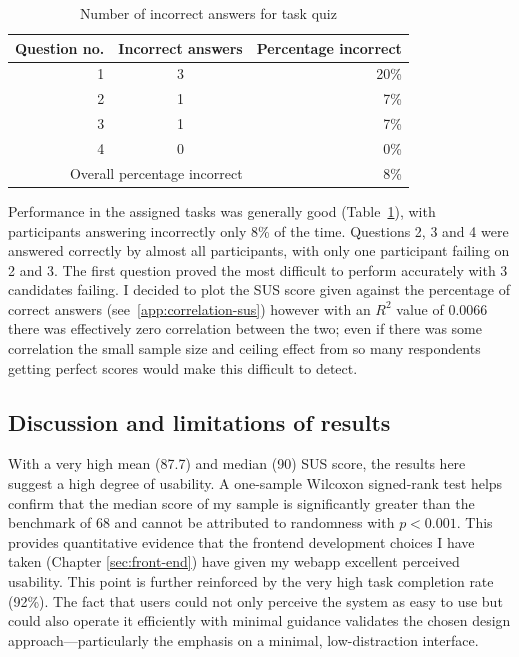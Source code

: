 \begin{table}[H]
  \centering
  \begin{tabular}{r c r}
    \hline
    Question no. & Incorrect answers & Percentage incorrect\\
    \hline
    1 & 3 & 20\%\\
    2 & 1 & 7\% \\
    3 & 1 & 7\% \\
    4 & 0 & 0\% \\
    \hline
    \multicolumn{2}{r}{Overall percentage incorrect} & 8\% \\
    \hline
  \end{tabular}
  \caption{Number of incorrect answers for task quiz}
  \label{tab:correct-metrics}
\end{table}

Performance in the assigned tasks was generally good
(Table~\ref{tab:correct-metrics}), with participants answering incorrectly only
8\% of the time. Questions 2, 3 and 4 were answered correctly by almost all
participants, with only one participant failing on 2 and 3. The first question
proved the most difficult to perform accurately with 3 candidates failing. I
decided to plot the SUS score given against the percentage of correct answers
(see~\ref{app:correlation-sus}) however with an $R^2$ value of 0.0066 there was
effectively zero correlation between the two; even if there was some correlation
the small sample size and ceiling effect from so many respondents getting
perfect scores would make this difficult to detect.

\subsection{Discussion and limitations of results}

With a very high mean (87.7) and median (90) SUS score, the results here suggest
a high degree of usability. A one-sample Wilcoxon signed-rank test helps confirm
that the median score of my sample is significantly greater than the benchmark
of 68 and cannot be attributed to randomness with \(p<0.001\). This provides
quantitative evidence that the frontend development choices I have taken
(Chapter \ref{sec:front-end}) have given my webapp excellent perceived
usability. This point is further reinforced by the very high task completion
rate (92\%). The fact that users could not only perceive the system as easy to
use but could also operate it efficiently with minimal guidance validates the
chosen design approach—particularly the emphasis on a minimal, low-distraction
interface.

